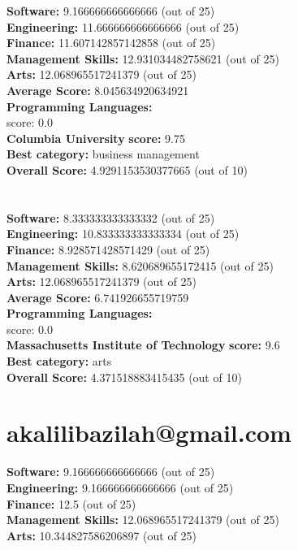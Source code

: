 \documentclass{article}
\begin{document}
\textbf{Software:} 9.166666666666666 (out of 25)\\
\textbf{Engineering: } 11.666666666666666 (out of 25)\\
\textbf{Finance:} 11.607142857142858 (out of 25)\\
\textbf{Management Skills:} 12.931034482758621 (out of 25)\\
\textbf{Arts:} 12.068965517241379 (out of 25)\\
\textbf{Average Score: } 8.045634920634921\\
\textbf{Programming Languages:} \\
score: 0.0\\
\textbf{Columbia University} \textbf{score:} 9.75\\
\textbf{Best category: } business management\\
\textbf{Overall Score: }4.9291153530377665 (out of 10)\section{}
\textbf{Software:} 8.333333333333332 (out of 25)\\
\textbf{Engineering: } 10.833333333333334 (out of 25)\\
\textbf{Finance:} 8.928571428571429 (out of 25)\\
\textbf{Management Skills:} 8.620689655172415 (out of 25)\\
\textbf{Arts:} 12.068965517241379 (out of 25)\\
\textbf{Average Score: } 6.741926655719759\\
\textbf{Programming Languages:} \\
score: 0.0\\
\textbf{Massachusetts Institute of Technology} \textbf{score:} 9.6\\
\textbf{Best category: } arts\\
\textbf{Overall Score: }4.371518883415435 (out of 10)\section{akalilibazilah@gmail.com}
\textbf{Software:} 9.166666666666666 (out of 25)\\
\textbf{Engineering: } 9.166666666666666 (out of 25)\\
\textbf{Finance:} 12.5 (out of 25)\\
\textbf{Management Skills:} 12.068965517241379 (out of 25)\\
\textbf{Arts:} 10.344827586206897 (out of 25)\\
\end{document}
